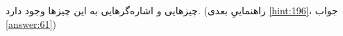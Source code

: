\section{}
\paragraph{}\label{hint:336}
چیزهایی و اشاره‌گرهایی به این چیزها وجود دارد. (راهنماییِ بعدی \ref{hint:196}، جواب \ref{answer:61})